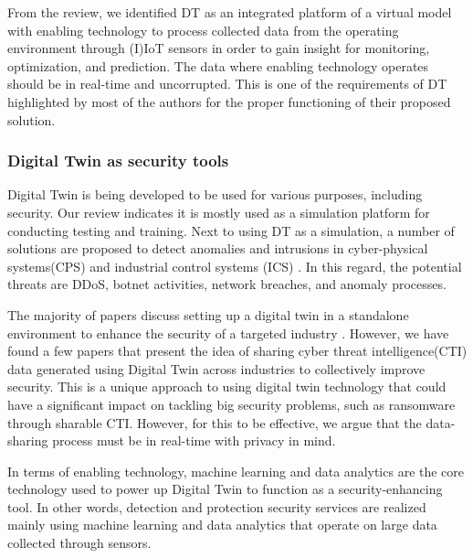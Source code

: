 From the review, we identified DT as an integrated platform of a virtual model with enabling technology to process collected data from the operating environment through (I)IoT sensors in order to gain insight for monitoring, optimization, and prediction. The data where enabling technology operates should be in real-time and uncorrupted. This is one of the requirements of DT highlighted by most of the authors for the proper functioning of their proposed solution. 



\subsubsection{Digital Twin as security tools}
Digital Twin is being developed to be used for various purposes, including security. Our review indicates it is mostly used as a simulation platform for conducting testing and training. Next to using DT as a simulation, a number of solutions are proposed to detect anomalies \cite{chukkapalliCyberPhysicalSystemSecurity2021} and intrusions in cyber-physical systems(CPS) and industrial control systems (ICS) \cite{vargheseDigitalTwinbasedIntrusion2022, akbarianIntrusionDetectionDigital2020}. In this regard, the potential threats are DDoS, botnet activities, network breaches, and anomaly processes.   


The majority of papers discuss setting up a digital twin in a standalone environment to enhance the security of a targeted industry \cite{almeaibedDigitalTwinAnalysis2021, veledarDigitalTwinsDependability2019, chukkapalliCyberPhysicalSystemSecurity2021, adrienbacueDigitalTwinsEnhanced2022}. However, we have found a few papers that present the idea of sharing cyber threat intelligence(CTI) \cite{dietzHarnessingDigitalTwin2022, almeaibedDigitalTwinAnalysis2021} data generated using Digital Twin across industries to collectively improve security. This is a unique approach to using digital twin technology that could have a significant impact on tackling big security problems, such as ransomware through sharable CTI. However, for this to be effective, we argue that the data-sharing process must be in real-time with privacy in mind. 


In terms of enabling technology, machine learning and data analytics are the core technology used to power up Digital Twin to function as a security-enhancing tool. In other words, detection and protection security services are realized mainly using machine learning and data analytics that operate on large data collected through sensors. 


